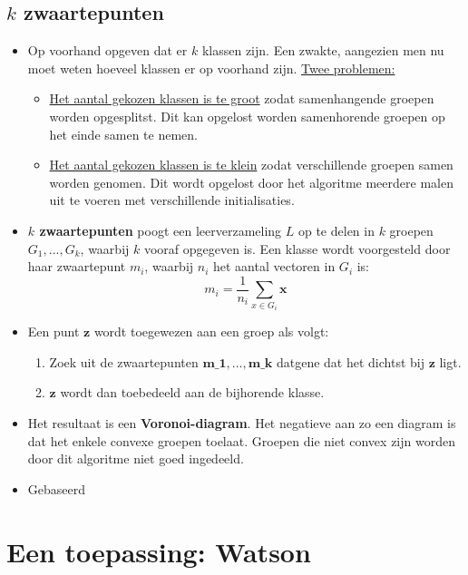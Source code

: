 \subsection{$k$ zwaartepunten}
\begin{itemize}
	\item Op voorhand opgeven dat er $k$ klassen zijn.
	\alert Een zwakte, aangezien men nu moet weten hoeveel klassen er op voorhand zijn. \underline{Twee problemen:}
	\begin{itemize}
		\item \underline{Het aantal gekozen klassen is te groot} zodat samenhangende groepen worden opgesplitst. Dit kan opgelost worden samenhorende groepen op het einde samen te nemen.
		\item \underline{Het aantal gekozen klassen is te klein} zodat verschillende groepen samen worden genomen. Dit wordt opgelost door het algoritme meerdere malen uit te voeren met verschillende initialisaties. 
	\end{itemize}
	\item \textbf{$k$ zwaartepunten} poogt een leerverzameling $L$ op te delen in $k$ groepen $G_1, ..., G_k$, waarbij $k$ vooraf opgegeven is. Een klasse wordt voorgesteld door haar zwaartepunt $m_i$, waarbij $n_i$ het aantal vectoren in $G_i$ is:
	$$m_i = \frac{1}{n_i}\sum_{x \in G_i} \textbf{x}$$
	\item Een punt $\textbf{z}$ wordt toegewezen aan een groep als volgt:
	\begin{enumerate}
		\item Zoek uit de zwaartepunten $\textbf{m_1}, ..., \textbf{m_k}$ datgene dat het dichtst bij $\textbf{z}$ ligt.
		\item $\textbf{z}$ wordt dan toebedeeld aan de bijhorende klasse.
	\end{enumerate}
	\item Het resultaat is een \textbf{Voronoi-diagram}. Het negatieve aan zo een diagram is dat het enkele convexe groepen toelaat.
	\alert Groepen die niet convex zijn worden door dit algoritme niet goed ingedeeld.
	\item Gebaseerd 
	
\end{itemize}
\section{Een toepassing: Watson}